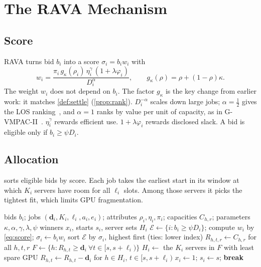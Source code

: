\documentclass[journal]{IEEEtran}
\theoremstyle{remark}
\begin{document}
\section{The RAVA Mechanism}\label{sec:mech}
\subsection{Score}
RAVA turns bid $b_i$ into a score $\sigma_i=b_iw_i$ with
\begin{equation}\label{eq:score}
w_i=\frac{\pi_i\,g_\kappa(\rho_i)\,\eta_i^{\gamma}\,(1+\lambda\varphi_i)}{D_i^{\alpha}},\qquad g_\kappa(\rho)=\rho+(1-\rho)\kappa.
\end{equation}
The weight $w_i$ does not depend on $b_i$. The factor $g_\kappa$ is the key change from earlier work: it matches \cref{def:settle} (\cref{prop:rank}). $D_i^{-\alpha}$ scales down large jobs; $\alpha=\tfrac12$ gives the LOS ranking~\cite{lehmann2002}, and $\alpha=1$ ranks by value per unit of capacity, as in G-VMPAC-II~\cite{nejad2015}. $\eta_i^\gamma$ rewards efficient use. $1+\lambda\varphi_i$ rewards disclosed slack. A bid is eligible only if $b_i\ge\psi D_i$.

\subsection{Allocation}
 sorts eligible bids by score. Each job takes the earliest start in its window at which $K_i$ servers have room for all $\ell_i$ slots. Among those servers it picks the tightest fit, which limits GPU fragmentation.

\begin{algorithm}[!t]
\caption{RAVA-Allocate}\label{alg:alloc}
\begin{algorithmic}[1]
\Require bids $b_i$; jobs $(\mathbf{d}_i,K_i,\ell_i,a_i,e_i)$; attributes $\rho_i,\eta_i,\pi_i$; capacities $C_{h,r}$; parameters $\kappa,\alpha,\gamma,\lambda,\psi$
\Ensure winners $x_i$, starts $s_i$, server sets $H_i$
\State $\mathcal{E}\gets\{i:b_i\ge\psi D_i\}$; compute $w_i$ by \eqref{eq:score}; $\sigma_i\gets b_iw_i$
\State sort $\mathcal{E}$ by $\sigma_i$, highest first (ties: lower index)
\State $R_{h,t,r}\gets C_{h,r}$ for all $h,t,r$
    \State $F\gets\{h: R_{h,t}\ge\mathbf{d}_i\ \forall t\in[s,s+\ell_i)\}$
      \State $H_i\gets$ the $K_i$ servers in $F$ with least spare GPU
      \State $R_{h,t}\gets R_{h,t}-\mathbf{d}_i$ for $h\in H_i$, $t\in[s,s+\ell_i)$
      \State $x_i\gets1$; $s_i\gets s$; \textbf{break}
    \EndIf
  \EndFor
\EndFor
\end{algorithmic}
\end{algorithm}
\end{document}
